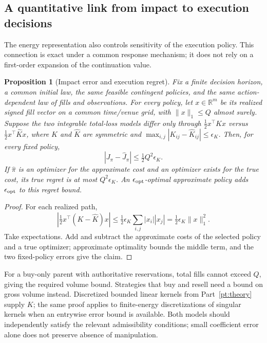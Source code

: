 \documentclass[11pt]{article}
\numberwithin{equation}{section}
\newtheorem{proposition}[theorem]{Proposition}
\theoremstyle{definition}
\theoremstyle{remark}
\newcommand{\R}{\mathbb{R}}
\theoremstyle{definition}
\begin{document}
\subsection{A quantitative link from impact to execution decisions}

The energy representation also controls sensitivity of the execution policy.
This connection is exact under a common response mechanism; it does not rely
on a first-order expansion of the continuation value.

\begin{proposition}[Impact error and execution regret]\label{prop:impacttransfer}
Fix a finite decision horizon, a common initial law, the same feasible
contingent policies, and the same action-dependent law of fills and observations.
For every policy, let $x\in\R^m$ be its realized signed fill vector on a
common time/venue grid, with $\|x\|_1\leq Q$ almost surely. Suppose the two
integrable total-loss models differ only through
$\tfrac12x^\top Kx$ versus $\tfrac12x^\top\widehat Kx$, where $K$ and
$\widehat K$ are symmetric and
$\max_{i,j}|K_{ij}-\widehat K_{ij}|\leq\epsilon_K$.
Then, for every fixed policy,
\[
 |J_\pi-\widehat J_\pi|\leq\tfrac12Q^2\epsilon_K.
\]
If $\widehat\pi$ is an optimizer for the approximate cost and an optimizer
exists for the true cost, its true regret is at most $Q^2\epsilon_K$.
An $\epsilon_{\rm opt}$-optimal approximate policy adds
$\epsilon_{\rm opt}$ to this regret bound.
\end{proposition}
\begin{proof}
For each realized path,
\[
 \left|\tfrac12x^\top(K-\widehat K)x\right|
 \leq\tfrac12\epsilon_K\sum_{i,j}|x_i||x_j|
 =\tfrac12\epsilon_K\|x\|_1^2.
\]
Take expectations. Add and subtract the approximate costs of the selected
policy and a true optimizer; approximate optimality bounds the middle term,
and the two fixed-policy errors give the claim.
\end{proof}

For a buy-only parent with authoritative reservations, total fills cannot
exceed $Q$, giving the required volume bound. Strategies that buy and resell
need a bound on gross volume instead. Discretized bounded linear kernels from
Part~\ref{pt:theory} supply $K$; the same proof applies to finite-energy
discretizations of singular kernels when an entrywise error bound is available.
Both models should independently satisfy the relevant admissibility conditions;
small coefficient error alone does not preserve absence of manipulation.
\end{document}
